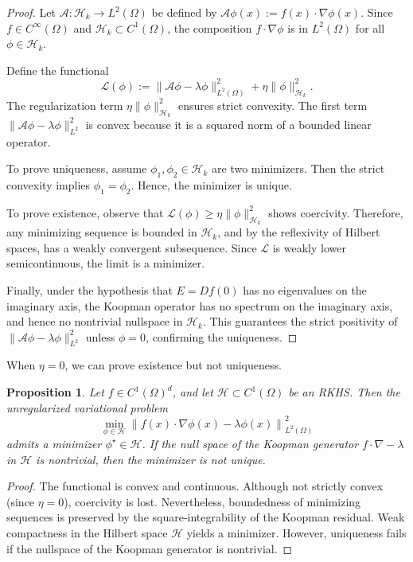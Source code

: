\documentclass[11pt]{article}
\theoremstyle{plain}
\newtheorem{proposition}[theorem]{Proposition}
\def\[{\begin{equation}}
\def\]{\end{equation}}
\begin{document}
\begin{proof}
Let $\mathcal{A}: \mathcal{H}_k \to L^2(\Omega)$ be defined by $\mathcal{A} \phi(x) := f(x) \cdot \nabla \phi(x)$. Since $f \in C^\infty(\Omega)$ and $\mathcal{H}_k \subset C^1(\Omega)$, the composition $f \cdot \nabla \phi$ is in $L^2(\Omega)$ for all $\phi \in \mathcal{H}_k$.

Define the functional
\[
\mathcal{L}(\phi) := \| \mathcal{A} \phi - \lambda \phi \|_{L^2(\Omega)}^2 + \eta \| \phi \|_{\mathcal{H}_k}^2.
\]
The regularization term $\eta \| \phi \|_{\mathcal{H}_k}^2$ ensures strict convexity. The first term $\| \mathcal{A} \phi - \lambda \phi \|_{L^2}^2$ is convex because it is a squared norm of a bounded linear operator.

To prove uniqueness, assume $\phi_1, \phi_2 \in \mathcal{H}_k$ are two minimizers. Then the strict convexity implies $\phi_1 = \phi_2$. Hence, the minimizer is unique.

To prove existence, observe that $\mathcal{L}(\phi) \geq \eta \| \phi \|_{\mathcal{H}_k}^2$ shows coercivity. Therefore, any minimizing sequence is bounded in $\mathcal{H}_k$, and by the reflexivity of Hilbert spaces, has a weakly convergent subsequence. Since $\mathcal{L}$ is weakly lower semicontinuous, the limit is a minimizer.

Finally, under the hypothesis that $E = Df(0)$ has no eigenvalues on the imaginary axis, the Koopman operator has no spectrum on the imaginary axis, and hence no nontrivial nullspace in $\mathcal{H}_k$. This guarantees the strict positivity of $\| \mathcal{A} \phi - \lambda \phi \|_{L^2}^2$ unless $\phi = 0$, confirming the uniqueness.

\end{proof}
When  \( \eta = 0 \), we can prove existence but not uniqueness. 

\begin{proposition}
Let $f \in C^1(\Omega)^d$, and let $\mathcal{H} \subset C^1(\Omega)$ be an RKHS. Then the unregularized variational problem
\[
\min_{\phi \in \mathcal{H}} \left\| f(x) \cdot \nabla \phi(x) - \lambda \phi(x) \right\|_{L^2(\Omega)}^2
\]
admits a minimizer $\phi^\star \in \mathcal{H}$. If the null space of the Koopman generator $f \cdot \nabla - \lambda$ in $\mathcal{H}$ is nontrivial, then the minimizer is not unique.
\end{proposition}

\begin{proof}
The functional is convex and continuous. Although not strictly convex (since $\eta = 0$), coercivity is lost. Nevertheless, boundedness of minimizing sequences is preserved by the square-integrability of the Koopman residual. Weak compactness in the Hilbert space $\mathcal{H}$ yields a minimizer. However, uniqueness fails if the nullspace of the Koopman generator is nontrivial.
\end{proof}
\end{document}
